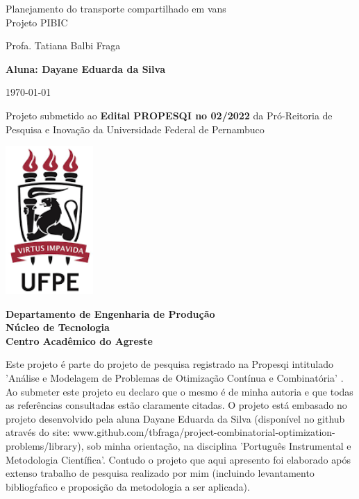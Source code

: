 \documentclass[11pt,a4paper]{article}
\newcommand{\titlestr}{Planejamento do transporte compartilhado em vans \\ Projeto PIBIC}
\newcommand{\authorstr}{Profa. Tatiana Balbi Fraga} %
\begin{document}
\begin{titlepage}
  \centering
  
  {\LARGE \titlestr \par}

  \vspace{1cm}
  {\Large \authorstr \par}

  {\bf Aluna: Dayane Eduarda da Silva}

  \vspace{1cm}
  \today     %

  \vspace{1.3cm}
  Projeto submetido ao
  {\bf Edital PROPESQI no 02/2022}
  da Pró-Reitoria de Pesquisa e Inovação
  da Universidade Federal de Pernambuco

  \includegraphics[width=0.25\textwidth]{logos/ufpe_logo.png}

  \vspace{1.8cm}
  \flushleft
  {\bf Departamento de Engenharia de Produção} \\
  {\bf Núcleo de Tecnologia} \\
  {\bf Centro Acadêmico do Agreste} \\

 \vspace{5mm} {\footnotesize Este projeto é parte do projeto de pesquisa registrado na Propesqi intitulado 'Análise e Modelagem de Problemas de Otimização Contínua e Combinatória' \citep{Fraga2018}. Ao submeter este projeto eu declaro que o mesmo é de minha autoria e que todas as referências consultadas estão claramente citadas. O projeto está embasado no projeto desenvolvido pela aluna Dayane Eduarda da Silva (disponível no github através do site: www.github.com/tbfraga/project-combinatorial-optimization-problems/library), sob minha orientação, na disciplina 'Português Instrumental e Metodologia Científica'. Contudo o projeto que aqui apresento foi elaborado após extenso trabalho de pesquisa realizado por mim (incluindo levantamento bibliogŕafico e proposição da metodologia a ser aplicada).\par}
    

\end{titlepage}
\end{document}
